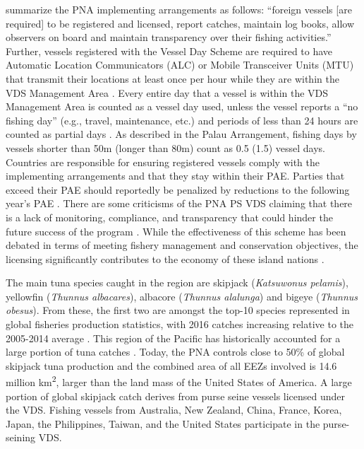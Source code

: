 \documentclass[9p,twocolumn,twoside,lineno]{pnas-new}
\begin{document}
\cite{yeeting2018stabilising} summarize the PNA implementing arrangements as follows: “foreign vessels [are required] to be registered and licensed, report catches, maintain log books, allow observers on board and maintain transparency over their fishing activities.” Further, vessels registered with the Vessel Day Scheme are required to have Automatic Location Communicators (ALC) or Mobile Transceiver Units (MTU) that transmit their locations at least once per hour while they are within the VDS Management Area \citep{PNA2016}. Every entire day that a vessel is within the VDS Management Area is counted as a vessel day used, unless the vessel reports a “no fishing day” (e.g., travel, maintenance, etc.) and periods of less than 24 hours are counted as partial days \citep{PNA2016}.  As described in the Palau Arrangement, fishing days by vessels shorter than 50m (longer than 80m) count as 0.5 (1.5) vessel days. Countries are responsible for ensuring registered vessels comply with the implementing arrangements and that they stay within their PAE. Parties that exceed their PAE should reportedly be penalized by reductions to the following year’s PAE \citep{PNA2016}. There are some criticisms of the PNA PS VDS claiming that there is a lack of monitoring, compliance, and transparency that could hinder the future success of the program \citep{Arnason2014,yeeting2018stabilising}. While the effectiveness of this scheme has been
debated in terms of meeting fishery management and conservation
objectives, the licensing significantly contributes to the economy of
these island nations \citep{havice_2010}.

The main tuna species caught in the region are skipjack
(\emph{Katsuwonus pelamis}), yellowfin (\emph{Thunnus albacares}),
albacore (\emph{Thunnus alalunga}) and bigeye (\emph{Thunnus obesus}).
From these, the first two are amongst the top-10 species represented in
global fisheries production statistics, with 2016 catches increasing
relative to the 2005-2014 average \citep{fao_2018}. This region of the
Pacific has historically accounted for a large portion of tuna catches
\cite{aqorau_1997}. Today, the PNA controls close to 50\% of global
skipjack tuna production \cite{pna_website_2018} and the combined area of all EEZs involved is 14.6 million km\textsuperscript{2}, larger than the land mass of the United States of America. A large portion of global skipjack
catch derives from purse seine vessels licensed under the VDS.
Fishing vessels from Australia, New Zealand, China, France, Korea,
Japan, the Philippines, Taiwan, and the United States participate in the
purse-seining VDS.
\end{document}
